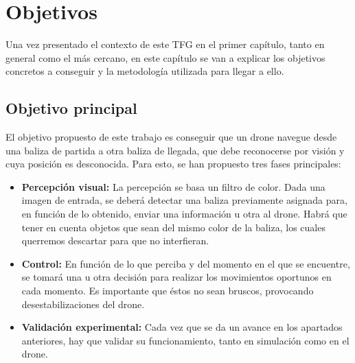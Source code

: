 \chapter{Objetivos}\label{cap.Objetivos}
\hspace{1 cm} Una vez presentado el contexto de este TFG en el primer cap\'itulo, tanto en general como el m\'as cercano, en este cap\'itulo se van a explicar los objetivos concretos a conseguir y la metodolog\'ia utilizada para llegar a ello.

\section{Objetivo principal}
\hspace{1 cm} El objetivo propuesto de este trabajo es conseguir que un drone navegue desde una baliza de partida a otra baliza de llegada, que debe reconocerse por visi\'on y cuya posici\'on es desconocida. Para esto, se han propuesto tres fases principales:

\begin{itemize}
\item \textbf{Percepci\'on visual:} La percepci\'on se basa un filtro de color. Dada una imagen de entrada, se deber\'a detectar una baliza previamente asignada para, en funci\'on de lo obtenido, enviar una informaci\'on u otra al drone. Habr\'a que tener en cuenta objetos que sean del mismo color de la baliza, los cuales querremos descartar para que no interfieran. 

\item \textbf{Control:} En funci\'on de lo que perciba y del momento en el que se encuentre, se tomar\'a una u otra decisi\'on para realizar los movimientos oportunos en cada momento. Es importante que \'estos no sean bruscos, provocando desestabilizaciones del drone.

\item \textbf{Validaci\'on experimental:} Cada vez que se da un avance en los apartados anteriores, hay que validar su funcionamiento, tanto en simulaci\'on como en el drone.

\end{itemize}

